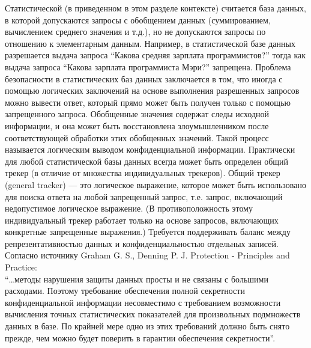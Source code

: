 Статистической (в приведенном в этом разделе контексте) считается база данных, в которой допускаются запросы с обобщением данных (суммированием, вычислением среднего значения и т.д.), но не допускаются запросы по отношению к элементарным данным. Например, в статистической базе данных разрешается выдача запроса \enquote{Какова средняя зарплата программистов?} тогда как выдача запроса \enquote{Какова зарплата программиста Мэри?} запрещена. Проблема безопасности в статистических баз данных заключается в том, что иногда с помощью логических заключений на основе выполнения разрешенных запросов можно вывести ответ, который прямо может быть получен только с помощью запрещенного запроса. Обобщенные значения содержат следы исходной информации, и она может быть восстановлена злоумышленником после соответствующей обработки этих обобщенных значений. Такой процесс называется логическим выводом конфиденциальной информации. Практически для любой статистической базы данных всегда может быть определен общий трекер (в отличие от множества индивидуальных трекеров). Общий трекер (general tracker) — это логическое выражение, которое может быть использовано для поиска ответа на любой запрещенный запрос, т.е. запрос, включающий недопустимое логическое выражение. (В противоположность этому индивидуальный трекер работает только на основе запросов, включающих конкретные запрещенные выражения.) Требуется поддерживать баланс между репрезентативностью данных и конфиденциальностью отдельных записей. 
\\

Согласно источнику Graham G. S., Denning P. J. Protection - Principles and Practice:
\\

\enquote{…методы нарушения защиты данных просты и не связаны с большими расходами. Поэтому требование обеспечения полной секретности конфиденциальной информации несовместимо с требованием возможности вычисления точных статистических показателей для произвольных подмножеств данных в базе. По крайней мере одно из этих требований должно быть снято прежде, чем можно будет поверить в гарантии обеспечения секретности}.
\\

